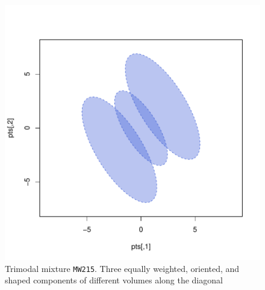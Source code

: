 \begin{figure}
\begin{Rgraph}[0.9]
\includegraphics{chapter3-figMW215}
    \caption{Trimodal mixture {\tt MW215}. Three equally weighted, oriented, and
             shaped components of different volumes along the diagonal}
    \label{fig:MW215}
\end{Rgraph}
\end{figure}


